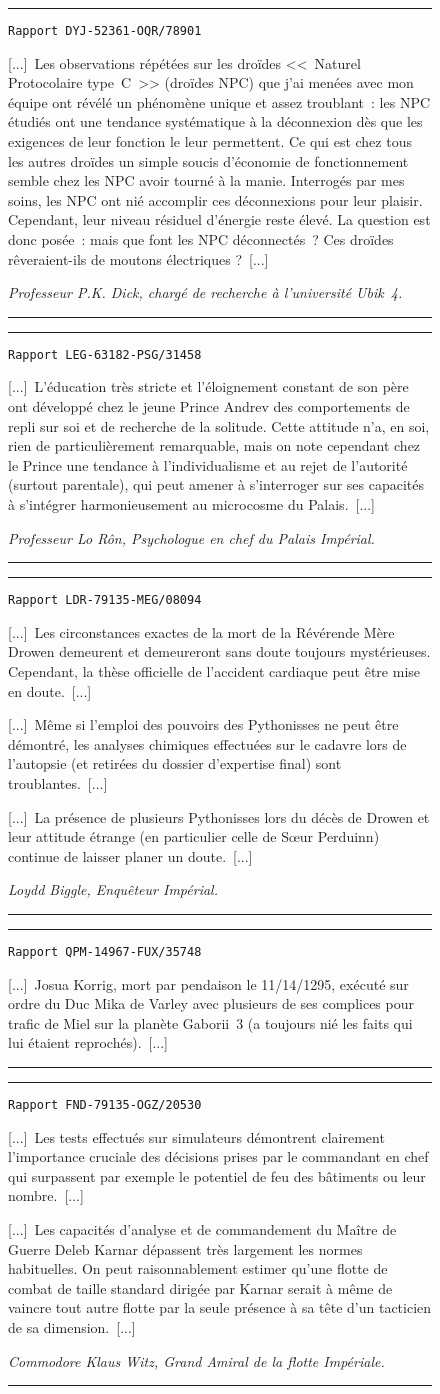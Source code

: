 \documentclass{article}
\newcommand{\indice}[3]{
    \begin{figure}[H]
        \begin{center}
            \rule{0.5\textwidth}{1pt}
        \end{center}
        \begin{framed}
            \begin{samepage}
                \texttt{Rapport #1}
                \nopagebreak

                [...]~#2~[...]

                \nopagebreak
                \hfill\textit{#3}
            \end{samepage}
        \end{framed}
        \caption{}
        \begin{center}
            \rule{0.5\textwidth}{1pt}
        \end{center}
    \end{figure}

}
\begin{document}
\indice
{DYJ-52361-OQR/78901}
{Les observations répétées sur les droïdes <<~Naturel Protocolaire
type~C~>> (droïdes NPC) que j’ai menées avec mon équipe ont révélé un
phénomène unique et assez troublant~: les NPC étudiés ont une tendance
systématique à la déconnexion dès que les exigences de leur fonction le
leur permettent. Ce qui est chez tous les autres droïdes un simple soucis
d’économie de fonctionnement semble chez les NPC avoir tourné à la manie.
Interrogés par mes soins, les NPC ont nié accomplir ces déconnexions pour
leur plaisir. Cependant, leur niveau résiduel d’énergie reste élevé. La
question est donc posée~: mais que font les NPC déconnectés~? Ces droïdes
rêveraient-ils de moutons électriques ?} 
{Professeur P.K. Dick, chargé de recherche à l’université Ubik~4.}

\indice
{LEG-63182-PSG/31458}
{L’éducation très stricte et l’éloignement constant de son père ont
développé chez le jeune Prince Andrev des comportements de repli sur soi et
de recherche de la solitude. Cette attitude n’a, en soi, rien de
particulièrement remarquable, mais on note cependant chez le Prince une
tendance à l’individualisme et au rejet de l’autorité (surtout parentale),
qui peut amener à s’interroger sur ses capacités à s’intégrer
harmonieusement au microcosme du Palais.}
{Professeur Lo Rôn, Psychologue en chef du Palais Impérial.}

\indice
{LDR-79135-MEG/08094}
{Les circonstances exactes de la mort de la Révérende Mère Drowen
demeurent et demeureront sans doute toujours mystérieuses. Cependant, la
thèse officielle de l’accident cardiaque peut être mise en doute.~[...]

\nobreak

[...]~Même si l’emploi des pouvoirs des Pythonisses ne peut être démontré,
les analyses chimiques effectuées sur le cadavre lors de l’autopsie (et
retirées du dossier d’expertise final) sont troublantes.~[...]

\nobreak

[...]~La présence de plusieurs Pythonisses lors du décès de Drowen et leur
attitude étrange (en particulier celle de S\oe{}ur Perduinn) continue de
laisser planer un doute.}
{Loydd Biggle, Enquêteur Impérial.}

\indice
{QPM-14967-FUX/35748}
{Josua Korrig, mort par pendaison le 11/14/1295, exécuté sur ordre du Duc
Mika de Varley avec plusieurs de ses complices pour trafic de Miel sur la
planète Gaborii~3 (a toujours nié les faits qui lui étaient reprochés).}
{}

\indice
{FND-79135-OGZ/20530}
{Les tests effectués sur simulateurs démontrent clairement l’importance
cruciale des décisions prises par le commandant en chef qui surpassent par
exemple le potentiel de feu des bâtiments ou leur nombre.~[...]

\nobreak

[...]~Les capacités d’analyse et de commandement du Maître de Guerre Deleb
Karnar dépassent très largement les normes habituelles. On peut
raisonnablement estimer qu’une flotte de combat de taille standard dirigée par
Karnar serait à même de vaincre tout autre flotte par la seule présence à sa
tête d’un tacticien de sa dimension.}
{Commodore Klaus Witz, Grand Amiral de la flotte Impériale.}
\end{document}
